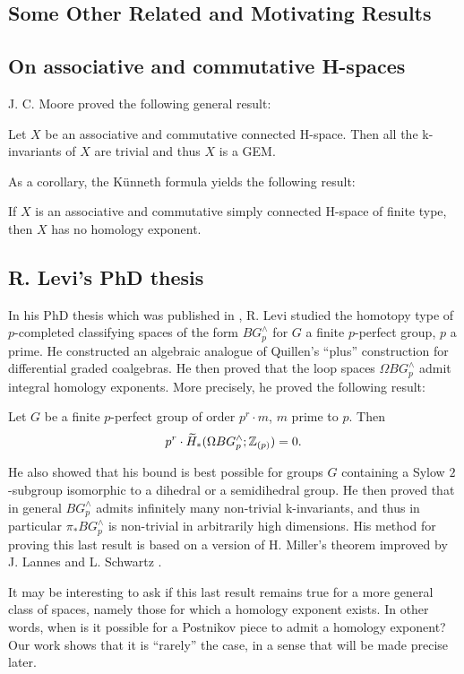 \subsection{Some Other Related and Motivating Results}

\subsection*{On associative and commutative H-spaces}
J. C. Moore \cite{Mo56} proved the following general result:
\begin{thm*}
Let $X$ be an associative and commutative connected H-space. Then all the k-invariants of $X$ are trivial and thus $X$ is a GEM.
\end{thm*}

As a corollary, the K\"unneth formula yields the following result:
\begin{cor*}
If $X$ is an associative and commutative simply connected H-space of finite type, then $X$ has no homology exponent.
\end{cor*}

\subsection*{R. Levi's PhD thesis}
In his PhD thesis which was published in \cite{Le95}, R. Levi studied the homotopy type of $p$-completed classifying spaces of the form $BG^\wedge_p$ for $G$ a finite $p$-perfect group, $p$ a prime. He constructed an algebraic analogue of Quillen's ``plus'' construction for differential graded coalgebras. He then proved that the loop spaces $\Omega BG^\wedge_p$ admit integral homology exponents. More precisely, he proved the following result:
\begin{thm*}
Let $G$ be a finite $p$-perfect group of order $p^r\cdot m$, $m$ prime to $p$. Then
$$
p^r\cdot\widetilde{H}_*(\Omega BG^\wedge_p;\mathbb{Z}_{(p)})=0.
$$
\end{thm*}
He also showed that his bound is best possible for groups $G$ containing a Sylow $2$-subgroup isomorphic to a dihedral or a semidihedral group. He then proved that in general $BG^\wedge_p$ admits infinitely many non-trivial k-invariants, and thus in particular $\pi_*BG^\wedge_p$ is non-trivial in arbitrarily high dimensions. His method for proving this last result is based on a version of H. Miller's theorem improved by J. Lannes and L. Schwartz \cite{LS86}.

It may be interesting to ask if this last result remains true for a more general class of spaces, namely those for which a homology exponent exists. In other words, when is it possible for a Postnikov piece to admit a homology exponent? Our work shows that it is ``rarely'' the case, in a sense that will be made precise later.

